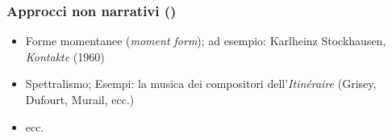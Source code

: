 \begin{frame}
    \frametitle{Approcci non narrativi ()}

    \begin{itemize}

        \item Forme momentanee (\emph{moment form}); ad esempio:
            Karlheinz Stockhausen, \emph{Kontakte} (1960)

        \item Spettralismo; Esempi:
            la musica dei compositori dell'\emph{Itin\'eraire}
            (Grisey, Dufourt, Murail, ecc.)

        \item ecc.

    \end{itemize}

\end{frame}
